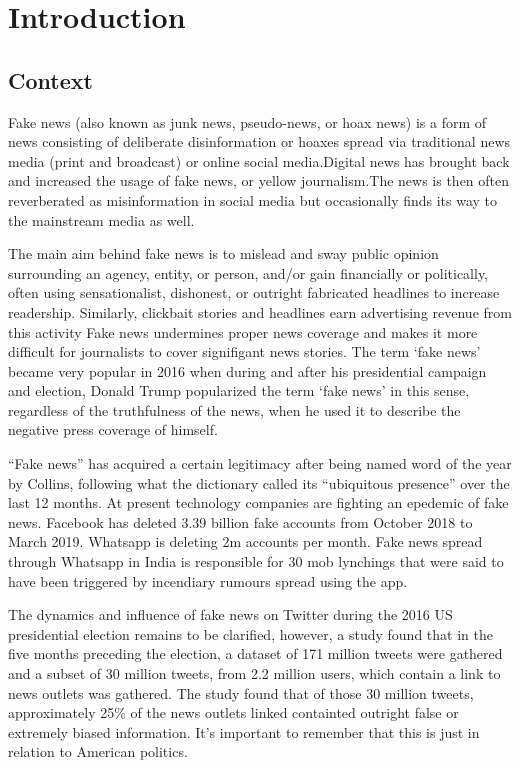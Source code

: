  \chapter{Introduction}
 \section{Context}
Fake news (also known as junk news, pseudo-news, or hoax news) is a form of news consisting of deliberate disinformation or hoaxes spread via traditional news media
(print and broadcast) or online social media.Digital news has brought back and increased the usage of fake news, or yellow journalism.The news is then often reverberated
as misinformation in social media but occasionally finds its way to the mainstream media as well.

The main aim behind fake news is to mislead and sway public opinion surrounding an agency, entity, or person, and/or gain financially or politically, often using sensationalist,
dishonest, or outright fabricated headlines to increase readership. Similarly, clickbait stories and headlines earn advertising revenue from this activity Fake news undermines proper
news coverage and makes it more difficult for journalists to cover signifigant news stories. The term `fake news' became very popular in 2016 when during and after his presidential
campaign and election, Donald Trump popularized the term `fake news' in this sense, regardless of the truthfulness of the news, when he used it to describe the negative press coverage of himself.

“Fake news” has acquired a certain legitimacy after being named word of the year by Collins, following what the dictionary called its “ubiquitous presence” over the last 12 months. At present technology companies are fighting an epedemic of fake news. Facebook has deleted 3.39 billion fake accounts from October 2018 to March 2019. Whatsapp is deleting 2m accounts per month. Fake news spread through Whatsapp in India is responsible for 30 mob lynchings that were said to have been triggered by incendiary rumours spread using the app. 

The dynamics and influence of fake news on Twitter during the 2016 US presidential election remains to be clarified, however, a study found that in the five months preceding the election, a dataset of 171 million tweets were gathered and a subset of 30 million tweets, from 2.2 million users, which contain a link to news outlets was gathered. The study found that of those 30 million tweets, approximately 25\% of the news outlets linked containted outright false or extremely biased information\cite{bovet2019influence}. It's important to remember that this is just in relation to American politics.

